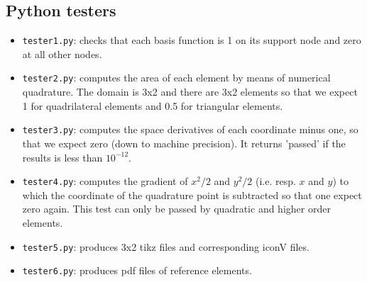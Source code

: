 %

%

\begin{multicols}{2}


\begin{tiny}

\end{tiny}
\end{multicols}




\newpage
\subsection*{Python testers}

\begin{itemize}
\item \lstinline{tester1.py}: checks that each basis function is 1 on its support node and zero at all other nodes.
\item \lstinline{tester2.py}: computes the area of each element by means of numerical quadrature. The domain is 3x2 and there are 3x2 elements so that we expect 1 for quadrilateral elements and 0.5 for triangular elements.  
\item \lstinline{tester3.py}: computes the space derivatives of each coordinate minus one, so that we expect zero (down to machine precision). It returns 'passed' if the results is less than $10^{-12}$.   
\item \lstinline{tester4.py}: computes the gradient of $x^2/2$ and $y^2/2$ (i.e. resp. $x$ and $y$) to which the coordinate of the quadrature point is subtracted so that one expect zero again. This test can only be passed by quadratic and higher order elements.
\item \lstinline{tester5.py}: produces 3x2 tikz files and corresponding iconV files. 
\item \lstinline{tester6.py}: produces pdf files of reference elements.
\end{itemize}


